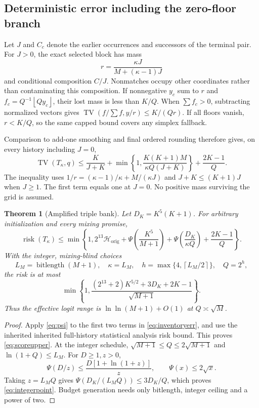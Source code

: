 \documentclass[11pt,letterpaper]{article}
\newtheorem{theorem}{Theorem}[section]
\theoremstyle{definition}\newtheorem{definition}[theorem]{Definition}
\theoremstyle{remark}\newtheorem{remark}[theorem]{Remark}
\newcommand{\TV}{\operatorname{TV}}
\newcommand{\floor}[1]{\left\lfloor #1\right\rfloor}
\newcommand{\ceil}[1]{\left\lceil #1\right\rceil}
\newcommand{\bl}{\operatorname{bitlength}}
\begin{document}
\subsection{Deterministic error including the zero-floor branch}
Let $J$ and $C_c$ denote the earlier occurrences and successors of the terminal pair. For $J>0$, the exact selected block has mass
\begin{equation}\label{eq:blockmass}
 r=\frac{\kappa J}{M+(\kappa-1)J}
\end{equation}
and conditional composition $C/J$. Nonmatches occupy other coordinates rather than contaminating this composition. If nonnegative $y_c$ sum to $r$ and $f_c=Q^{-1}\floor{Qy_c}$, their lost mass is less than $K/Q$. When $\sum f_c>0$, subtracting normalized vectors gives $\TV(f/\sum f,y/r)\le K/(Qr)$. If all floors vanish, $r<K/Q$, so the same capped bound covers any simplex fallback.

Comparison to add-one smoothing and final ordered rounding therefore gives, on every history including $J=0$,
\begin{equation}\label{eq:inventoryerr}
 \TV(T_\kappa,q)\le\frac K{J+K}+
 \min\left\{1,\frac{K(K+1)M}{\kappa Q(J+K)}\right\}
 +\frac{2K-1}{Q}.
\end{equation}
The inequality uses $1/r=(\kappa-1)/\kappa+M/(\kappa J)$ and $J+K\le(K+1)J$ when $J\ge1$. The first term equals one at $J=0$. No positive mass surviving the grid is assumed.

\begin{theorem}[Amplified triple bank]\label{thm:scoreupper}
Let $D_K=K^5(K+1)$. For arbitrary initialization and every mixing promise,
\begin{equation}\label{eq:scoreupper}
 \operatorname{risk}(T_\kappa)\le\min\left\{1,
 2^{13}\mathcal H_{\mathrm{orig}}+\Psi\left(\frac{K^5}{M+1}\right)
 +\Psi\left(\frac{D_K}{\kappa Q}\right)+\frac{2K-1}{Q}\right\}.
\end{equation}
With the integer, mixing-blind choices
\[
 L_M=\bl(M+1),\quad \kappa=L_M,\quad
 h=\max\{4,\ceil{L_M/2}\},\quad Q=2^h,
\]
the risk is at most
\begin{equation}\label{eq:integerpoint}
 \min\left\{1,\frac{(2^{13}+2)K^{5/2}+3D_K+2K-1}{\sqrt{M+1}}\right\}.
\end{equation}
Thus the effective logit range is $\ln\ln(M+1)+O(1)$ at $Q\asymp\sqrt M$.
\end{theorem}
\begin{proof}
Apply \eqref{eq:psi} to the first two terms in \eqref{eq:inventoryerr}, and use the inherited inherited full-history statistical analysis risk bound. This proves \eqref{eq:scoreupper}. At the integer schedule, $\sqrt{M+1}\le Q\le2\sqrt{M+1}$ and $\ln(1+Q)\le L_M$. For $D\ge1,z>0$,
\[
 \Psi(D/z)\le\frac{D[1+\ln(1+z)]}{z},\qquad \Psi(x)\le2\sqrt x.
\]
Taking $z=L_MQ$ gives $\Psi(D_K/(L_MQ))\le3D_K/Q$, which proves \eqref{eq:integerpoint}. Budget generation needs only bitlength, integer ceiling and a power of two.
\end{proof}
\end{document}
